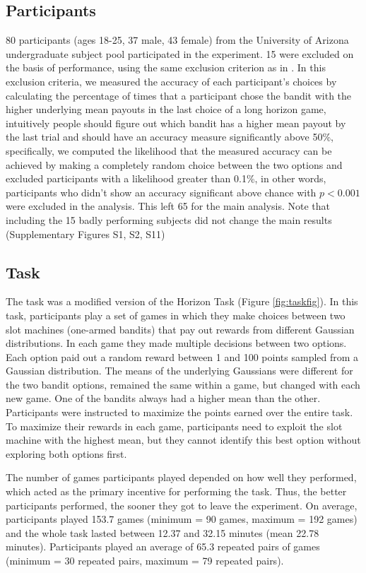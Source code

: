 \documentclass[12pt]{article}
\begin{document}
{\subsection*{Participants}
80 participants (ages 18-25, 37 male, 43 female) from the University of Arizona undergraduate subject pool participated in the experiment. 15 were excluded on the basis of performance, using the same exclusion criterion as in \cite{wilson2014}. In this exclusion criteria, we measured the accuracy of each participant's choices by calculating the percentage of times that a participant chose the bandit with the higher underlying mean payouts in the last choice of a long horizon game, intuitively people should figure out which bandit has a higher mean payout by the last trial and should have an accuracy measure significantly above 50\%, specifically, we computed the likelihood that the measured accuracy can be achieved by making a completely random choice between the two options and excluded participants with a likelihood greater than 0.1\%, in other words, participants who didn't show an accuracy significant above chance with $p < 0.001$ were excluded in the analysis. This left 65 for the main analysis. Note that including the 15 badly performing subjects did not change the main results (Supplementary Figures S1, S2, S11)

\subsection*{Task}
The task was a modified version of the Horizon Task \citep{wilson2014} (Figure \ref{fig:taskfig}). In this task, participants play a set of games in which they make choices between two slot machines (one-armed bandits) that pay out rewards from different Gaussian distributions. In each game they made multiple decisions between two options. Each option paid out a random reward between 1 and 100 points sampled from a Gaussian distribution. The means of the underlying Gaussians were different for the two bandit options, remained the same within a game, but changed with each new game. One of the bandits always had a higher mean than the other. Participants were instructed to maximize the points earned over the entire task. To maximize their rewards in each game, participants need to exploit the slot machine with the highest mean, but they cannot identify this best option without exploring both options first. 

The number of games participants played depended on how well they performed, which acted as the primary incentive for performing the task. Thus, the better participants performed, the sooner they got to leave the experiment. On average, participants played 153.7 games (minimum = 90 games, maximum = 192 games) and the whole task lasted between 12.37 and 32.15 minutes (mean 22.78 minutes). Participants played an average of 65.3 repeated pairs of games (minimum = 30 repeated pairs, maximum =  79 repeated pairs).

}
\end{document}
